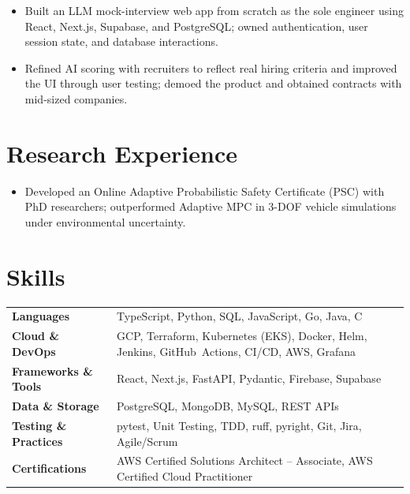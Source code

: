 \documentclass[11pt, letterpaper]{article}
\begin{document}
\begin{itemize}
  \item Built an LLM mock-interview web app from scratch as the sole engineer using React, Next.js, Supabase, and PostgreSQL; owned authentication, user session state, and database interactions.
  \item Refined AI scoring with recruiters to reflect real hiring criteria and improved the UI through user testing; demoed the product and obtained contracts with mid-sized companies.
\end{itemize}

\section{Research Experience}
\begin{itemize}
  \item Developed an Online Adaptive Probabilistic Safety Certificate (PSC) with PhD researchers; outperformed Adaptive MPC in 3-DOF vehicle simulations under environmental uncertainty.
\end{itemize}

\section{Skills}
\begin{tabularx}{\textwidth}{@{}l @{\hspace{7pt}} >{\raggedright\arraybackslash}X@{}}
  \textbf{Languages} & TypeScript, Python, SQL, JavaScript, Go, Java, C \\[1pt]
  \textbf{Cloud \& DevOps} & GCP, Terraform, Kubernetes (EKS), Docker, Helm, Jenkins, GitHub~Actions, CI/CD, AWS, Grafana \\[1pt]
  \textbf{Frameworks \& Tools} & React, Next.js, FastAPI, Pydantic, Firebase, Supabase \\[1pt]
  \textbf{Data \& Storage} & PostgreSQL, MongoDB, MySQL, REST APIs \\[1pt]
  \textbf{Testing \& Practices} & pytest, Unit Testing, TDD, ruff, pyright, Git, Jira, Agile/Scrum \\[1pt]
  \textbf{Certifications} & AWS Certified Solutions Architect -- Associate, AWS Certified Cloud Practitioner \\
\end{tabularx}
\end{document}
